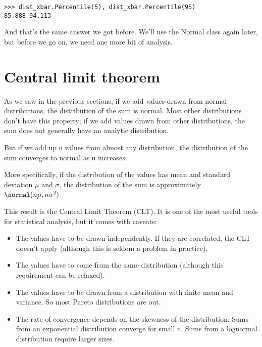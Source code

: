 \begin{verbatim}
>>> dist_xbar.Percentile(5), dist_xbar.Percentile(95)
85.888 94.113
\end{verbatim}

And that's the same answer we got before.  We'll use the Normal
class again later, but before we go on, we need one more bit of
analysis.


\section{Central limit theorem}
\label{CLT}

As we saw in the previous sections, if we add values drawn from normal
distributions, the distribution of the sum is normal.
Most other distributions don't have this property;
if we add values drawn from other distributions, the sum does not
generally have an analytic distribution.
 
 

But if we add up {\tt n} values from
almost any distribution, the distribution of the sum converges to
normal as {\tt n} increases.

More specifically, if the distribution of the values has mean and
standard deviation $\mu$ and $\sigma$, the distribution of the sum is
approximately $\normal(n \mu, n \sigma^2)$.

This result is the Central Limit Theorem (CLT).  It is one of the
most useful tools for statistical analysis, but it comes with
caveats:

\begin{itemize}

\item The values have to be drawn independently.  If they are
correlated, the CLT doesn't apply (although this is seldom a problem
in practice).

\item The values have to come from the same distribution (although
  this requirement can be relaxed).

\item The values have to be drawn
  from a distribution with finite mean and variance.  So most Pareto
  distributions are out.

\item The rate of convergence depends
  on the skewness of the distribution.  Sums from an exponential
  distribution converge for small {\tt n}.  Sums from a
  lognormal distribution require larger sizes.

\end{itemize}

